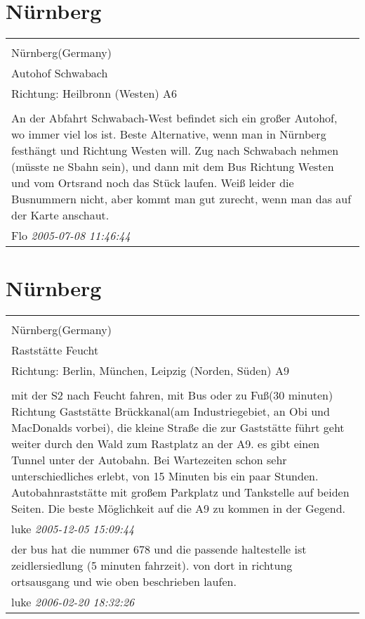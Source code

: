 \documentclass[a4paper,12pt]{article}
\begin{document}
\section{Nürnberg}
\begin{tabular}{|p{13cm}|}
\hline\\
Nürnberg(Germany)\\
Autohof Schwabach\\
Richtung: Heilbronn (Westen) A6 \\
\hline\\
An der Abfahrt Schwabach-West befindet sich ein großer Autohof, wo immer viel los ist.
Beste Alternative, wenn man in Nürnberg festhängt und Richtung Westen will. Zug nach Schwabach nehmen (müsste ne Sbahn sein), und dann mit dem Bus Richtung Westen und vom Ortsrand noch das Stück laufen.
Weiß leider die Busnummern nicht, aber kommt man gut zurecht, wenn man das auf der Karte anschaut. \\
Flo \textit{ 2005-07-08 11:46:44 }\\\hline
\end{tabular}


\section{Nürnberg}
\begin{tabular}{|p{13cm}|}
\hline\\
Nürnberg(Germany)\\
Raststätte Feucht\\
Richtung: Berlin, München, Leipzig (Norden, Süden) A9 \\
\hline\\
mit der S2 nach Feucht fahren, mit Bus oder zu Fuß(30 minuten) Richtung Gaststätte Brückkanal(am Industriegebiet, an Obi und MacDonalds vorbei), die kleine Straße die zur Gaststätte führt geht weiter durch den Wald zum Rastplatz an der A9. es gibt einen Tunnel unter der Autobahn.
Bei Wartezeiten schon sehr unterschiedliches erlebt, von 15 Minuten bis ein paar Stunden. Autobahnraststätte mit großem Parkplatz und Tankstelle auf beiden Seiten. Die beste Möglichkeit auf die A9 zu kommen in der Gegend. \\
luke \textit{ 2005-12-05 15:09:44 }\\\hline der bus hat die nummer 678 und die passende haltestelle ist zeidlersiedlung (5 minuten fahrzeit). von dort in richtung ortsausgang und wie oben beschrieben laufen. \\
luke \textit{ 2006-02-20 18:32:26 }\\\hline
\end{tabular}
\end{document}
